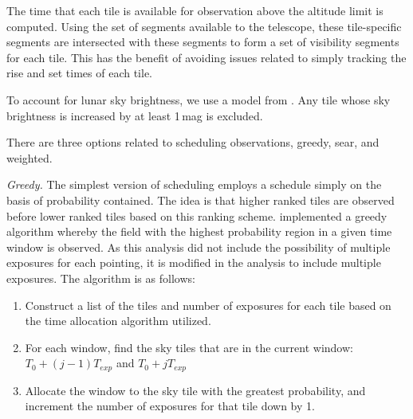 \documentclass[twocolumn]{aastex61}
\begin{document}
The time that each tile is available for observation above the altitude limit is computed.
Using the set of segments available to the telescope, these tile-specific segments  are intersected with these segments to form a set of visibility segments for each tile.
This has the benefit of avoiding issues related to simply tracking the rise and set times of each tile.

To account for lunar sky brightness, we use a model from \cite{CoSt2016b}. 
Any tile whose sky brightness is increased by at least 1\,mag is excluded.

There are three options related to scheduling observations, greedy, sear, and weighted.

\emph{Greedy.} The simplest version of scheduling employs a schedule simply on the basis of probability contained. The idea is that higher ranked tiles are observed before lower ranked tiles based on this ranking scheme. \cite{RaSi2017} implemented a greedy algorithm whereby the field with the highest probability region in a given time window is observed. As this analysis did not include the possibility of multiple exposures for each pointing, it is modified in the analysis to include multiple exposures. The algorithm is as follows:

\begin{enumerate}
\item Construct a list of the tiles and number of exposures for each tile based on the time allocation algorithm utilized.
\item For each window, find the sky tiles that are in the current window: $T_0 + (j-1) T_{exp}$ and $T_0 + j T_{exp}$
\item Allocate the window to the sky tile with the greatest probability, and increment the number of exposures for that tile down by 1.
\end{enumerate}
\end{document}
